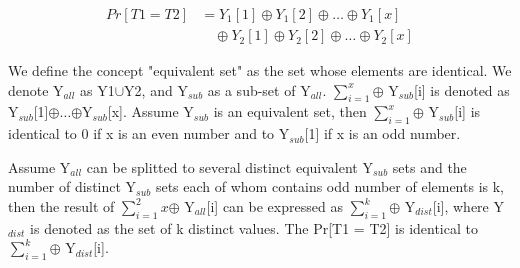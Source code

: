 \documentclass{article}
\begin{document}
\begin{equation}\label{tag_collision_exp}
\begin{split}
Pr[T1=T2] &= Y_1[1] \oplus Y_1[2] \oplus \ldots \oplus Y_1[x]\\
		&\quad	\oplus Y_2[1] \oplus Y_2[2] \oplus \ldots \oplus Y_2[x]
\end{split}
\end{equation}

We define the concept "equivalent set" as the set whose elements are identical.
We denote Y$_{all}$ as Y1$\cup$Y2, and Y$_{sub}$ as a sub-set of Y$_{all}$.
$\sum_{i=1}^x$$\oplus$ Y$_{sub}$[i] is denoted as
Y$_{sub}$[1]$\oplus$$\ldots$$\oplus$Y$_{sub}$[x]. Assume Y$_{sub}$ is an
equivalent set, then $\sum_{i=1}^x$$\oplus$ Y$_{sub}$[i] is identical to 0 if x
is an even number and to Y$_{sub}$[1] if x is an odd number.

Assume Y$_{all}$ can be splitted to several distinct equivalent Y$_{sub}$ sets
and the number of distinct Y$_{sub}$ sets each of whom contains odd number of elements is k, then the
result of $\sum_{i=1}^2x$$\oplus$ Y$_{all}$[i] can be expressed as
$\sum_{i=1}^k$$\oplus$ Y$_{dist}$[i], where Y$_{dist}$ is denoted as the set of
k distinct values. The Pr[T1 = T2] is identical to $\sum_{i=1}^k$$\oplus$
Y$_{dist}$[i]. 
\end{document}
